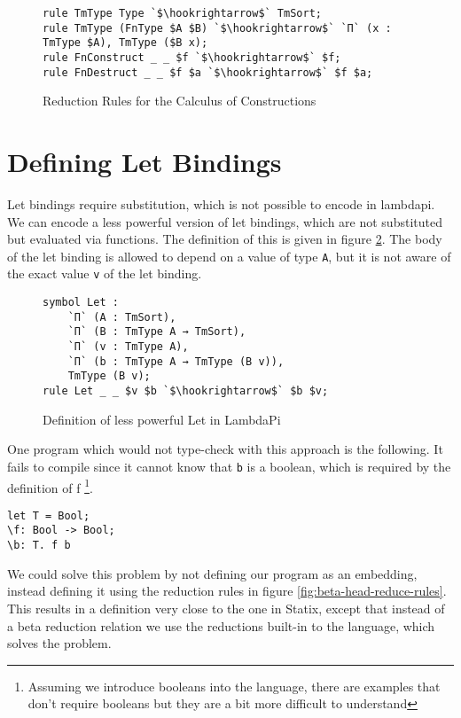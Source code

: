 \begin{figure}[ht]
	\begin{lstlisting}
rule TmType Type `$\hookrightarrow$` TmSort;
rule TmType (FnType $A $B) `$\hookrightarrow$` `Π` (x : TmType $A), TmType ($B x);
rule FnConstruct _ _ $f `$\hookrightarrow$` $f;
rule FnDestruct _ _ $f $a `$\hookrightarrow$` $f $a;
	\end{lstlisting}
	\caption{Reduction Rules for the Calculus of Constructions}
	\label{fig:lp-rules}
\end{figure}

\section{\label{ch:comp-lambdapi:let}Defining Let Bindings}

Let bindings require substitution, which is not possible to encode in lambdapi. We can encode a less powerful version of let bindings, which are not substituted but evaluated via functions. The definition of this is given in figure \ref{fig:lp-let}. The body of the let binding is allowed to depend on a value of type \verb|A|, but it is not aware of the exact value \verb|v| of the let binding. 

\begin{figure}[ht]
	\begin{lstlisting}
symbol Let : 
	`Π` (A : TmSort), 
	`Π` (B : TmType A → TmSort), 
	`Π` (v : TmType A),
	`Π` (b : TmType A → TmType (B v)),
	TmType (B v);
rule Let _ _ $v $b `$\hookrightarrow$` $b $v;
	\end{lstlisting}
	\caption{Definition of less powerful Let in LambdaPi}
	\label{fig:lp-let}
\end{figure}

One program which would not type-check with this approach is the following. It fails to compile since it cannot know that \verb|b| is a boolean, which is required by the definition of f \footnote{Assuming we introduce booleans into the language, there are examples that don't require booleans but they are a bit more difficult to understand}.
\begin{lstlisting}
let T = Bool;
\f: Bool -> Bool;
\b: T. f b
\end{lstlisting}

We could solve this problem by not defining our program as an embedding, instead defining it using the reduction rules in figure \ref{fig:beta-head-reduce-rules}. This results in a definition very close to the one in Statix, except that instead of a beta reduction relation we use the reductions built-in to the language, which solves the problem. 

